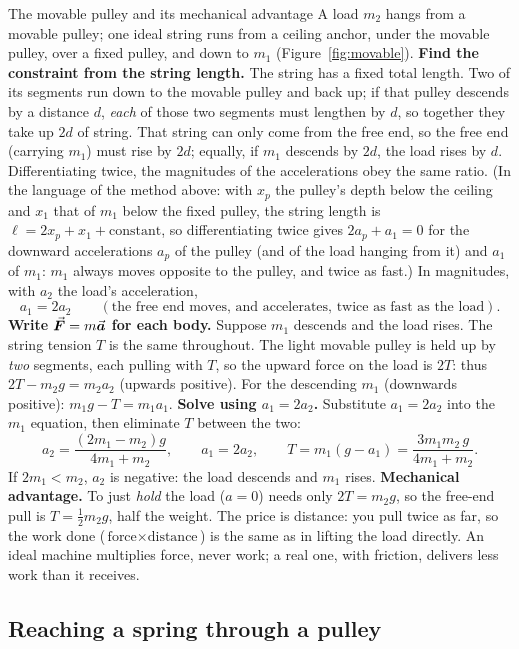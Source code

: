 \begin{derivbox}{The movable pulley and its mechanical advantage}
A load $m_2$ hangs from a movable pulley; one ideal string runs from a ceiling anchor, under the movable
pulley, over a fixed pulley, and down to $m_1$ (Figure~\ref{fig:movable}).
 \textbf{Find the constraint from the string length.} The string has a fixed total length. Two
of its segments run down to the movable pulley and back up; if that pulley descends by a distance $d$,
\emph{each} of those two segments must lengthen by $d$, so together they take up $2d$ of string. That
string can only come from the free end, so the free end (carrying $m_1$) must rise by $2d$; equally, if
$m_1$ descends by $2d$, the load rises by $d$. Differentiating twice, the magnitudes of the accelerations
obey the same ratio. (In the language of the method above: with $x_p$ the pulley's depth below the
ceiling and $x_1$ that of $m_1$ below the fixed pulley, the string length is $\ell=2x_p+x_1+\text{constant}$, so
differentiating twice gives $2a_p+a_1=0$ for the downward accelerations $a_p$ of the pulley (and of the
load hanging from it) and $a_1$ of $m_1$: $m_1$ always moves opposite to the pulley, and twice as fast.)
In magnitudes, with $a_2$ the load's acceleration,
\[
a_1=2a_2\qquad(\text{the free end moves, and accelerates, twice as fast as the load}).
\]
 \textbf{Write $\vec{\bm{F}}=m\vec{\bm{a}}$ for each body.} Suppose $m_1$ descends and the load rises. The string
tension $T$ is the same throughout. The light movable pulley is held up by \emph{two} segments, each
pulling with $T$, so the upward force on the load is $2T$: thus $2T-m_2 g=m_2 a_2$ (upwards positive).
For the descending $m_1$ (downwards positive): $m_1 g-T=m_1 a_1$.
 \textbf{Solve using $a_1=2a_2$.} Substitute $a_1=2a_2$ into the $m_1$ equation, then eliminate
$T$ between the two:
\[
a_2=\frac{(2m_1-m_2)g}{4m_1+m_2},\qquad a_1=2a_2,\qquad T=m_1(g-a_1)=\frac{3m_1m_2\,g}{4m_1+m_2}.
\]
If $2m_1<m_2$, $a_2$ is negative: the load descends and $m_1$ rises.
 \textbf{Mechanical advantage.} To just \emph{hold} the load ($a=0$) needs only $2T=m_2 g$, so
the free-end pull is $T=\tfrac12 m_2 g$, half the weight. The price is distance: you pull twice as far,
so the work done ($\text{force}\times\text{distance}$) is the same as in lifting the load directly. An
ideal machine multiplies force, never work; a real one, with friction, delivers less work than it
receives.
\end{derivbox}

\subsection{Reaching a spring through a pulley}

